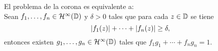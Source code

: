 \begin{theorem}
    El problema de la corona es equivalente a: \\

    Sean $f_1, \dots, f_n \in \mathcal{H}^{\infty}(\mathbb{D})$ y $\delta > 0$ tales que para cada $z \in \mathbb{D}$ se tiene
\begin{equation*}
    \left\lvert f_1(z)\right\rvert + \cdots + \left\lvert f_n(z)\right\rvert \geq \delta,
\end{equation*}
     entonces existen $g_1, \dots, g_n \in \mathcal{H}^{\infty}(\mathbb{D})$ tales que $f_1 g_1 + \cdots + f_n g_n = 1$.

\end{theorem}

